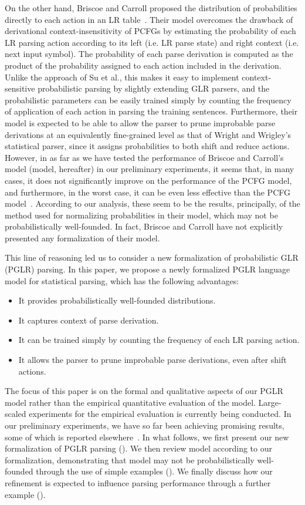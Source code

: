 \documentclass[a4j]{article}
\def\BC{}
\def\sec#1{}
\begin{document}
On the other hand, Briscoe and Carroll proposed the distribution of
probabilities directly to each action in an LR
table~\cite{briscoe:93:a}. Their model overcomes the drawback of
derivational context-insensitivity of PCFGs by estimating the
probability of each LR parsing action according to its left (i.e. LR
parse state) and right context (i.e. next input symbol).
The probability of each parse derivation is computed as the product of
the probability assigned to each action included in the
derivation. Unlike the approach of Su et al., this makes it easy to
implement context-sensitive probabilistic parsing by slightly extending
GLR parsers, and the probabilistic parameters can be easily trained
simply by counting the frequency of application of each action in
parsing the training sentences. Furthermore, their model is expected to
be able to allow the parser to prune improbable parse derivations at an
equivalently fine-grained level as that of Wright and Wrigley's
statistical parser, since it assigns probabilities to both shift and
reduce actions. However, in as far as we have tested the performance of
Briscoe and Carroll's model (\BC model, hereafter) in our preliminary
experiments, it seems that, in many cases, it does not significantly
improve on the performance of the PCFG model, and furthermore, in the
worst case, it can be even less effective than the PCFG
model~\cite{virach:97:b}. According to our analysis, these seem to be
the results, principally, of the method used for normalizing
probabilities in their model, which may not be probabilistically
well-founded. In fact, Briscoe and Carroll have not explicitly presented
any formalization of their model.

This line of reasoning led us to consider a new formalization of
probabilistic GLR (PGLR) parsing. In this paper, we propose a newly
formalized PGLR language model for statistical parsing, which has the
following advantages:
\begin{itemize}
\item It provides probabilistically well-founded distributions.
\item It captures context of parse derivation.
\item It can be trained simply by counting the frequency of each LR
  parsing action.
\item It allows the parser to prune improbable parse derivations,
even after shift actions.
\end{itemize}
The focus of this paper is on the formal and qualitative aspects of our
PGLR model rather than the empirical quantitative evaluation of the
model. Large-scaled experiments for the empirical evaluation is
currently being conducted. In our preliminary experiments, we have so
far been achieving promising results, some of which is reported
elsewhere~\cite{virach:97:b,virach:97:c}. In what follows, we first present our new
formalization of PGLR parsing (\sec{PGLR}). We then review \BC model
according to our formalization, demonstrating that \BC model may not be
probabilistically well-founded through the use of simple examples
(\sec{BC-model}). We finally discuss how our refinement is expected to
influence parsing performance through a further example (\sec{example}).
\end{document}
